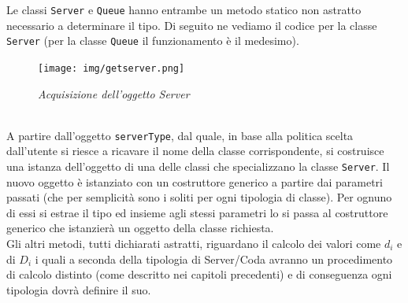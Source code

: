 \documentclass[12pt,a4paper,italian]{article}
\begin{document}
Le classi \texttt{Server} e \texttt{Queue} hanno entrambe un metodo statico non astratto necessario a determinare il tipo. Di seguito ne vediamo il codice per la classe \texttt{Server} (per la classe \texttt{Queue} il funzionamento è il medesimo).
\newpage
\begin{figure}[h]
	\centering
	\texttt{[image: img/getserver.png]}
	\caption{\emph{Acquisizione dell'oggetto Server}}\label{getserver}
\end{figure}
\ \\
A partire dall'oggetto \texttt{serverType}, dal quale, in base alla politica scelta dall'utente si riesce a ricavare il nome della classe corrispondente, si costruisce una istanza dell'oggetto di una delle classi che specializzano la classe \texttt{Server}. Il nuovo oggetto è istanziato con un costruttore generico a partire dai parametri passati (che per semplicità sono i soliti per ogni tipologia di classe). Per ognuno di essi si estrae il tipo ed insieme agli stessi parametri lo si passa al costruttore generico che istanzierà un oggetto della classe richiesta.\\ 
Gli altri metodi, tutti dichiarati astratti, riguardano il calcolo dei valori come $d_i$ e di $D_i$ i quali a seconda della tipologia di Server/Coda avranno un procedimento di calcolo distinto (come descritto nei capitoli precedenti) e di conseguenza ogni tipologia dovrà definire il suo.
\end{document}
